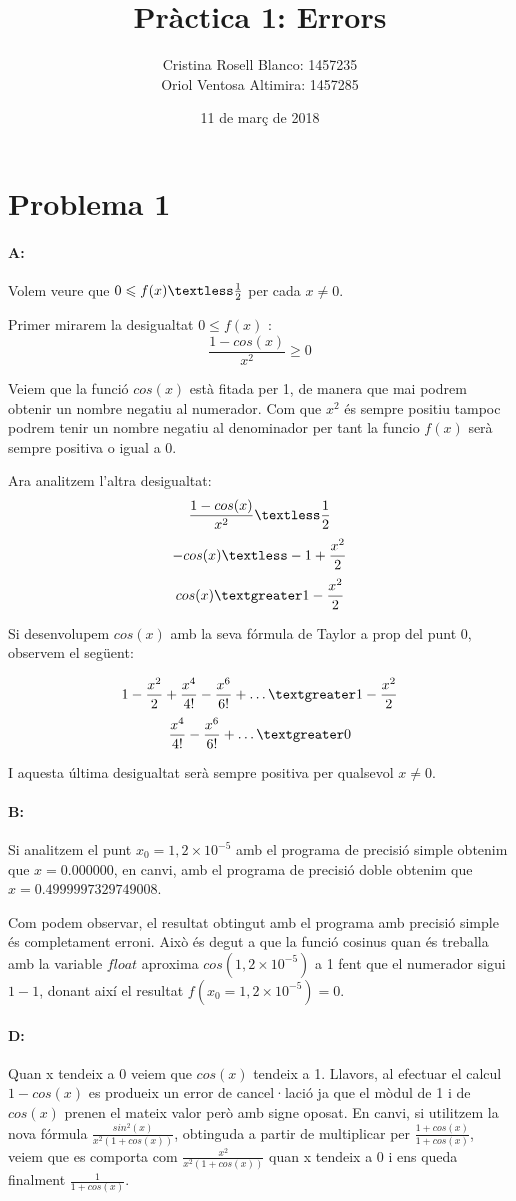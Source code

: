 \documentclass{article}
\title{Pràctica 1: Errors}
\author{Cristina Rosell Blanco: 1457235  \\ Oriol Ventosa Altimira: 1457285}
\date{11 de març de 2018}
\begin{document}
	\maketitle
	
	\newpage

	\section{Problema 1}
	\paragraph{A:} Volem veure que $0\leqslant f(x) \textless \frac{1}{2}$ per cada $x\neq0$. 
	
	Primer mirarem la desigualtat $0\leqslant f(x)$ :
	$$\frac{1-cos(x)}{x^2} \geqslant 0$$
	
	Veiem que la funció $cos(x)$ està fitada per 1, de manera que mai podrem obtenir un nombre negatiu al numerador. Com que $x^2$ és sempre positiu tampoc podrem tenir un nombre negatiu al denominador per tant la funcio $f(x)$ serà sempre positiva o igual a 0.
	
	Ara analitzem l'altra desigualtat:
	$$\frac{1-cos(x)}{x^2} \textless \frac{1}{2}$$
	$$-cos(x) \textless -1+\frac{x^2}{2}$$
	$$cos(x) \textgreater 1-\frac{x^2}{2}$$	
	
	Si desenvolupem $cos(x)$ amb la seva fórmula de Taylor a prop del punt 0, observem el següent:
	
	$$1-\frac{x^2}{2}+\frac{x^4}{4!}-\frac{x^6}{6!}+\dots \textgreater 1-\frac{x^2}{2}$$
	$$\frac{x^4}{4!}-\frac{x^6}{6!}+\dots \textgreater 0$$
	
	I aquesta última desigualtat serà sempre positiva per qualsevol $x\neq0$.
	
	\paragraph{B:} Si analitzem el punt $x_0=1,2\times 10^{-5}$ amb el programa de precisió simple obtenim que $x=0.000000$, en canvi, amb el programa de precisió doble obtenim que $x=0.4999997329749008$. 
	
	Com podem observar, el resultat obtingut amb el programa amb precisió simple és completament erroni. Això és degut a que la funció cosinus quan és treballa amb la variable $float$ aproxima $cos(1,2\times 10^{-5})$ a 1 fent que el numerador sigui $1-1$, donant així el resultat $f(x_0=1,2\times 10^{-5})=0$.
	
	\paragraph{D:} Quan x tendeix a 0 veiem que $cos(x)$ tendeix a 1. Llavors, al efectuar el calcul $1-cos(x)$ es produeix un error de cancel·lació ja que el mòdul de 1 i de $cos(x)$ prenen el mateix valor però amb signe oposat. En canvi, si utilitzem la nova fórmula $\frac{sin^2(x)}{x^2(1+cos(x))}$, obtinguda a partir de multiplicar per $\frac{1+cos(x)}{1+cos(x)}$, veiem que es comporta com $\frac{x^2}{x^2(1+cos(x))}$ quan x tendeix a 0 i ens queda finalment $\frac{1}{1+cos(x)}$. 
	
\end{document}
